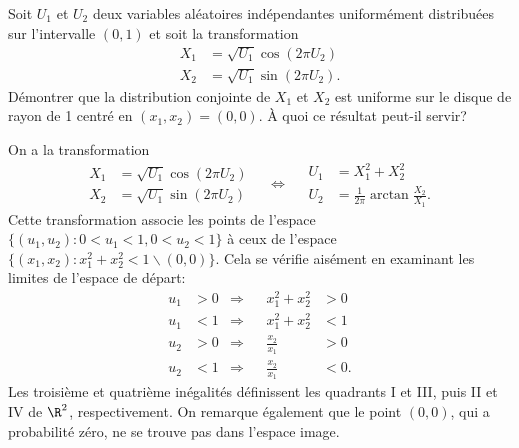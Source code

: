 \begin{exercice}
  \label{ex:simulation:cercle}
  Soit $U_1$ et $U_2$ deux variables aléatoires indépendantes
  uniformément distribuées sur l'intervalle $(0, 1)$ et soit la
  transformation
  \begin{align*}
    X_1 &= \sqrt{U_1} \cos(2 \pi U_2) \\
    X_2 &= \sqrt{U_1} \sin(2 \pi U_2).
  \end{align*}
  Démontrer que la distribution conjointe de $X_1$ et $X_2$ est
  uniforme sur le disque de rayon de 1 centré en $(x_1, x_2) = (0,
  0)$. À quoi ce résultat peut-il servir?
  \begin{sol}
    On a la transformation
    \begin{displaymath}
      \begin{split}
        X_1 &= \sqrt{U_1} \cos(2 \pi U_2) \\
        X_2 &= \sqrt{U_1} \sin(2 \pi U_2)
      \end{split}
      \quad \Leftrightarrow \quad
      \begin{split}
        U_1 &= X_1^2 + X_2^2 \\
        U_2 &= \frac{1}{2\pi} \arctan \frac{X_2}{X_1}.
      \end{split}
    \end{displaymath}
    Cette transformation associe les points de l'espace $\{(u_1, u_2):
    0 < u_1 < 1, 0 < u_2 < 1\}$ à ceux de l'espace $\{(x_1, x_2):
    x_1^2 + x_2^2 < 1 \backslash (0, 0)\}$. Cela se vérifie aisément
    en examinant les limites de l'espace de départ:
    \begin{align*}
      u_1 &> 0 &\Rightarrow&& x_1^2 + x_2^2 &> 0 \\
      u_1 &< 1 &\Rightarrow&& x_1^2 + x_2^2 &< 1 \\
      u_2 &> 0 &\Rightarrow&& \frac{x_2}{x_1} &> 0 \\
      u_2 &< 1 &\Rightarrow&& \frac{x_2}{x_1} &< 0.
    \end{align*}
    Les troisième et quatrième inégalités définissent les quadrants I
    et III, puis II et IV de $\R^2$, respectivement. On remarque
    également que le point $(0, 0)$, qui a probabilité zéro, ne se
    trouve pas dans l'espace image.


\end{sol}
\end{exercice}
